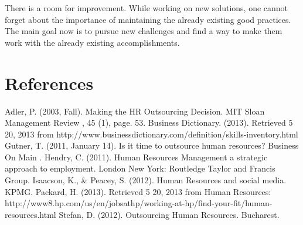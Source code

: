 \documentclass[a4paper,fleqn,11pt,dvips,titlepage]{article}
\numberwithin{figure}{section}
\numberwithin{equation}{section}
\begin{document}
There is a room for improvement. While working on new solutions, one cannot forget about the importance of maintaining the already existing good practices. The main goal now is to pursue new challenges and find a way to make them work with the already existing accomplishments. 

























\section{References}
Adler, P. (2003, Fall). Making the HR Outsourcing Decision. MIT Sloan Management Review , 45 (1), page. 53.
Business Dictionary. (2013). Retrieved 5 20, 2013 from http://www.businessdictionary.com/definition/skills-inventory.html
Gutner, T. (2011, January 14). Is it time to outsource human resources? Business On Main .
Hendry, C. (2011). Human Resources Management a strategic approach to employment. London New York: Routledge Taylor and Francis Group.
Isaacson, K., \& Peacey, S. (2012). Human Resources and social media. KPMG.
Packard, H. (2013). Retrieved 5 20, 2013 from Human Resources: http://www8.hp.com/us/en/jobsathp/working-at-hp/find-your-fit/human-resources.html
Stefan, D. (2012). Outsourcing Human Resources. Bucharest.
\end{document}
